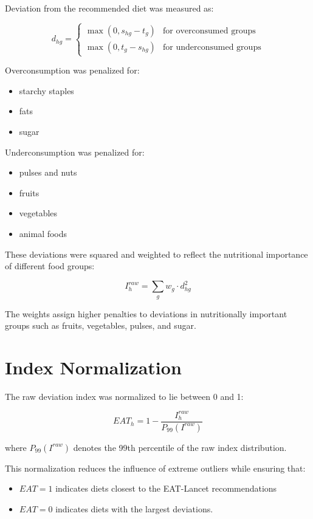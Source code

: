 \documentclass{article}
\begin{document}
Deviation from the recommended diet was measured as:

\[
d_{hg} =
\begin{cases}
\max(0, s_{hg} - t_g) & \text{for overconsumed groups} \\
\max(0, t_g - s_{hg}) & \text{for underconsumed groups}
\end{cases}
\]

Overconsumption was penalized for:

\begin{itemize}
\item starchy staples
\item fats
\item sugar
\end{itemize}

Underconsumption was penalized for:

\begin{itemize}
\item pulses and nuts
\item fruits
\item vegetables
\item animal foods
\end{itemize}

These deviations were squared and weighted to reflect the nutritional importance of different food groups:

\[
I_h^{raw} = \sum_g w_g \cdot d_{hg}^2
\]

The weights assign higher penalties to deviations in nutritionally important groups such as fruits, vegetables, pulses, and sugar.

\section{Index Normalization}

The raw deviation index was normalized to lie between 0 and 1:

\[
EAT_h = 1 - \frac{I_h^{raw}}{P_{99}(I^{raw})}
\]

where $P_{99}(I^{raw})$ denotes the 99th percentile of the raw index distribution.

This normalization reduces the influence of extreme outliers while ensuring that:

\begin{itemize}
\item $EAT = 1$ indicates diets closest to the EAT-Lancet recommendations
\item $EAT = 0$ indicates diets with the largest deviations.
\end{itemize}
\end{document}
